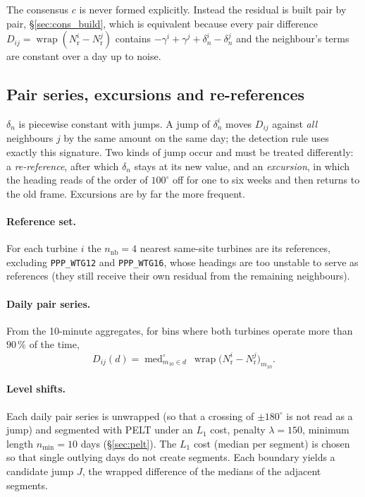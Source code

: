 \documentclass[11pt,a4paper]{article}
\theoremstyle{remark}
\newcommand{\wrap}{\operatorname{wrap}}
\newcommand{\cmed}{\operatorname{med}^{\circ}}
\newcommand{\dg}{^{\circ}}
\newcommand{\code}[1]{\texttt{#1}}
\newcommand{\Nr}{N_{\mathrm{r}}}
\begin{document}
The consensus $c$ is never formed explicitly. Instead the residual is built pair
by pair, \S\ref{sec:cons_build}, which is equivalent because every pair
difference $D_{ij} = \wrap(\Nr^i-\Nr^j)$ contains $-\gamma^i+\gamma^j+\delta_n^i-\delta_n^j$
and the neighbour's terms are constant over a day up to noise.

\subsection{Pair series, excursions and re-references}\label{sec:destep}
$\delta_n$ is piecewise constant with jumps. A jump of $\delta_n^i$ moves
$D_{ij}$ against \emph{all} neighbours $j$ by the same amount on the same day;
the detection rule uses exactly this signature. Two kinds of jump occur and
must be treated differently: a \emph{re-reference}, after which $\delta_n$
stays at its new value, and an \emph{excursion}, in which the heading reads of
the order of $100\dg$ off for one to six weeks and then returns to the old
frame. Excursions are by far the more frequent.

\paragraph{Reference set.} For each turbine $i$ the $n_{\mathrm{nb}}=4$ nearest
same-site turbines are its references, excluding \code{PPP\_WTG12} and
\code{PPP\_WTG16}, whose headings are too unstable to serve as references (they
still receive their own residual from the remaining neighbours).

\paragraph{Daily pair series.} From the 10-minute aggregates, for bins where both
turbines operate more than $90\,\%$ of the time,
\begin{equation}
  D_{ij}(d) = \cmed_{m_{10}\in d}\ \wrap\big(\Nr^i - \Nr^j\big)_{m_{10}} .
  \label{eq:pair_daily}
\end{equation}

\paragraph{Level shifts.} Each daily pair series is unwrapped (so that a
crossing of $\pm180\dg$ is not read as a jump) and segmented with PELT under an
$L_1$ cost, penalty $\lambda=150$, minimum length $n_{\min}=10$ days
(\S\ref{sec:pelt}). The $L_1$ cost (median per segment) is chosen so that single
outlying days do not create segments. Each boundary yields a candidate jump
$J$, the wrapped difference of the medians of the adjacent segments.
\end{document}

